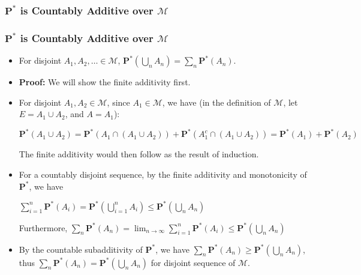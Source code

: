 \documentclass[handout]{beamer}
\newcommand{\BP}{\mathbf{P}}
\begin{document}
\subsubsection{$\BP^*$ is Countably Additive over $\mathcal{M}$}
\frame
{
  \frametitle{$\BP^*$ is Countably Additive over $\mathcal{M}$}

   \begin{itemize}

            \item<1->   [] \begin{Lemma}[2.3.9] For disjoint $A_1, A_2,\ldots \in \mathcal{M}$, $\BP^*(\bigcup_n A_n)=\sum_n \BP^*(A_n)$.               \end{Lemma}    
       
              \item<2-> []\textbf{Proof:} We will show the finite additivity first.               
             \item<3-> [1)]  For disjoint $A_1, A_2 \in \mathcal{M}$, since $A_1 \in \mathcal{M}$, we have (in the definition of $\mathcal{M}$, let $E=A_1\cup A_2$, and $A=A_1$):
             
             $\BP^*(A_1\cup A_2)=\BP^*(A_1\cap (A_1\cup A_2))+\BP^*(A_1^c \cap (A_1\cup A_2))=\BP^*(A_1)+\BP^*(A_2)$
             
             The finite additivity would then follow as the result of induction. 
             
                            \item<4-> [2)] For a countably disjoint sequence, by the finite additivity and monotonicity of $\BP^*$, we have
                            
                            $\sum_{i=1}^n \BP^*(A_i)=\BP^*(\bigcup_{i=1}^n A_i)\leq \BP^*(\bigcup_n A_n)$
                            
Furthermore,       $\sum_n \BP^*(A_n)=\lim_{n\rightarrow \infty} \sum_{i=1}^n \BP^*(A_i) \leq \BP^*(\bigcup_n A_n)$
                            
                \item<5-> [3)]  By the countable subadditivity of $\BP^*$, we have  $\sum_n \BP^*(A_n) \geq \BP^*(\bigcup_n A_n)$, thus  $\sum_n \BP^*(A_n) = \BP^*(\bigcup_n A_n)$ for disjoint sequence of $\mathcal{M}$.
    
                 \end{itemize}
}
\end{document}
